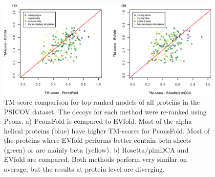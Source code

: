 \documentclass{bioinfo}
\begin{document}
\begin{figure}[!tpb]%
\centerline{\includegraphics[scale=0.7]{figures/vs.eps}}
\caption{TM-score comparison for top-ranked models of all proteins in
  the PSICOV dataset. The decoys for each method were re-ranked using
  Pcons. a) PconsFold is compared to EVfold. Most of the alpha helical
  proteins (blue) have higher TM-scores for PconsFold. Most of the
  proteins where EVfold performs better contain beta sheets (green) or
  are mainly beta (yellow). b) Rosetta/plmDCA and EVfold are
  compared. Both methods perform very similar on average, but the
  results at protein level are diverging.}\label{fig:vs}
\end{figure}
\end{document}
